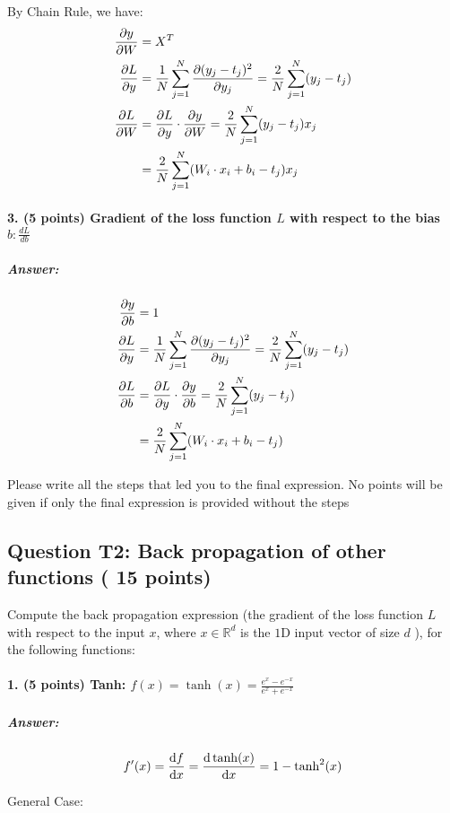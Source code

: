 \documentclass[10pt]{article}
\begin{document}
By Chain Rule, we have:
\begin{align*}
  \pdv{y}{W}&=X^T\\
  \pdv{L}{y}&=\frac{1}{N}\sum_{j=1}^{N}\pdv{(y_j-t_j)^2}{y_j} =\frac{2}{N}\sum_{j=1}^{N}(y_j-t_j)\\
  \pdv{L} {W}&= \pdv{L}{y}\cdot \pdv{y}{W} =\frac{2}{N}\sum_{j=1}^{N}(y_j-t_j)x_j\\
  &=\frac{2}{N}\sum_{j=1}^{N}(W_i\cdot x_i + b_i-t_j)x_j
\end{align*}


\paragraph{3. (5 points) Gradient of the loss function $L$ with respect to the bias $b: \frac{d L}{d b}$}
\subparagraph{Answer: }
\begin{align*}
  \pdv{y}{b}&=1\\
  \pdv{L}{y}&=\frac{1}{N}\sum_{j=1}^{N}\pdv{(y_j-t_j)^2}{y_j} =\frac{2}{N}\sum_{j=1}^{N}(y_j-t_j)\\
  \pdv{L} {b}&= \pdv{L}{y}\cdot \pdv{y}{b} =\frac{2}{N}\sum_{j=1}^{N}(y_j-t_j)\\
  &=\frac{2}{N}\sum_{j=1}^{N}(W_i\cdot x_i + b_i-t_j)
\end{align*}


Please write all the steps that led you to the final expression. No points will be given if only the final expression is provided without the steps

\subsection*{Question T2: Back propagation of other functions ( 15 points)}
Compute the back propagation expression (the gradient of the loss function $L$ with respect to the input $x$, where $x \in \mathbb{R}^{d}$ is the $1 \mathrm{D}$ input vector of size $d$ ), for the following functions:

\paragraph{1. (5 points) Tanh: $f(x)=\tanh (x)=\frac{e^{x}-e^{-x}}{e^{x}+e^{-x}}$}

\subparagraph{Answer: }

$$f'(x)=\dv{f}{x} = \dv{\tanh (x)}{x} = 1-\tanh^2 (x)$$


General Case:

\end{document}
